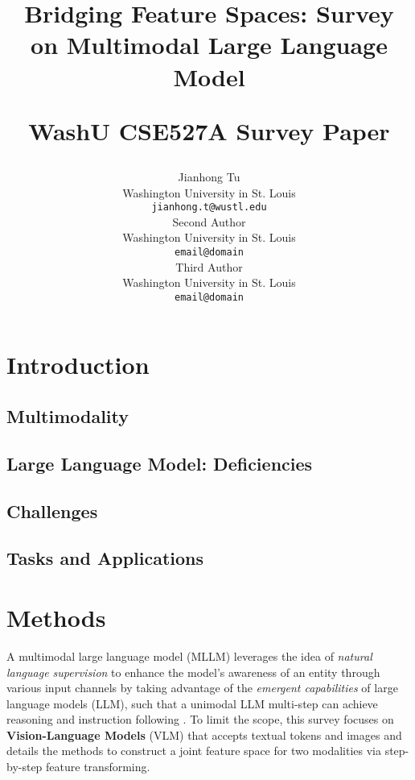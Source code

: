 \documentclass[11pt]{article}
\title{Bridging Feature Spaces: Survey on Multimodal Large Language Model



 \vspace{1em}
  \small{\normalfont WashU CSE527A Survey Paper} }
\author{Jianhong Tu \\
  Washington University in St. Louis \\
  \texttt{jianhong.t@wustl.edu} \\\And
  Second Author \\
  Washington University in St. Louis \\
  \texttt{email@domain} \\\AND
  Third Author \\
  Washington University in St. Louis \\
  \texttt{email@domain} \\}
\begin{document}
\maketitle

\begin{abstract}

\end{abstract}

\section{Introduction}

\subsection{Multimodality}

\subsection{Large Language Model: Deficiencies}

\subsection{Challenges}

\subsection{Tasks and Applications}

\section{Methods}
A multimodal large language model (MLLM) leverages the idea of \textit{natural language supervision} \citep{DBLP:conf/icml/RadfordKHRGASAM21} to enhance the model's awareness of an entity through various input channels by taking advantage of the \textit{emergent capabilities} \citep{DBLP:journals/tmlr/WeiTBRZBYBZMCHVLDF22} of  large language models (LLM), such that a unimodal LLM multi-step can achieve reasoning \citep{DBLP:journals/corr/abs-2112-11446} and instruction following \citep{DBLP:conf/nips/Ouyang0JAWMZASR22}. To limit the scope, this survey focuses on \textbf{Vision-Language Models} (VLM) that accepts textual tokens and images and details the methods to construct a joint feature space for two modalities via step-by-step feature transforming. 
\end{document}
